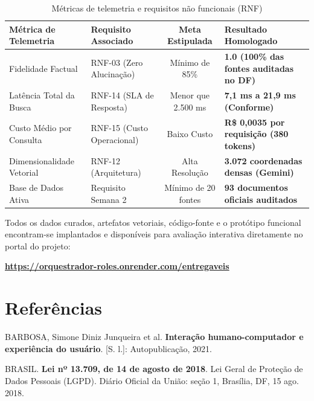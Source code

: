 \documentclass[12pt,a4paper]{article}
\begin{document}
\begin{table}[H]
\centering
\small
\renewcommand{\arraystretch}{1.15}
\caption{Métricas de telemetria e requisitos não funcionais (RNF)}
\begin{tabularx}{\textwidth}{p{4.2cm} p{4.2cm} c X}
\toprule
\textbf{Métrica de Telemetria} & \textbf{Requisito Associado} & \textbf{Meta Estipulada} & \textbf{Resultado Homologado} \\
\midrule
Fidelidade Factual & RNF-03 (Zero Alucinação) & Mínimo de 85\% & \textbf{1.0 (100\% das fontes auditadas no DF)} \\
Latência Total da Busca & RNF-14 (SLA de Resposta) & Menor que 2.500 ms & \textbf{7,1 ms a 21,9 ms (Conforme)} \\
Custo Médio por Consulta & RNF-15 (Custo Operacional) & Baixo Custo & \textbf{R\$ 0,0035 por requisição (380 tokens)} \\
Dimensionalidade Vetorial & RNF-12 (Arquitetura) & Alta Resolução & \textbf{3.072 coordenadas densas (Gemini)} \\
Base de Dados Ativa & Requisito Semana 2 & Mínimo de 20 fontes & \textbf{93 documentos oficiais auditados} \\
\bottomrule
\end{tabularx}
\vspace{0.1cm}
\end{table}

Todos os dados curados, artefatos vetoriais, código-fonte e o protótipo funcional encontram-se implantados e disponíveis para avaliação interativa diretamente no portal do projeto:
\begin{center}
\textbf{\url{https://orquestrador-roles.onrender.com/entregaveis}}
\end{center}

\clearpage

\section*{Referências}

\noindent BARBOSA, Simone Diniz Junqueira et al. \textbf{Interação humano-computador e experiência do usuário}. [S. l.]: Autopublicação, 2021.

\vspace{0.2cm}
\noindent BRASIL. \textbf{Lei nº 13.709, de 14 de agosto de 2018}. Lei Geral de Proteção de Dados Pessoais (LGPD). Diário Oficial da União: seção 1, Brasília, DF, 15 ago. 2018.
\end{document}
